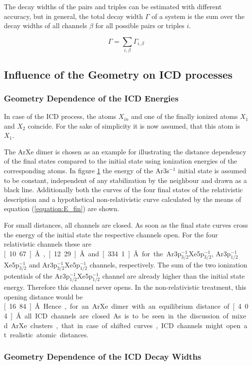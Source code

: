 The decay widths of the pairs and triples can be estimated with
different accuracy, but in general, the total decay width $\Gamma$ of
a system is the sum over the decay widths of all channels $\beta$ for
all possible pairs or triples $i$.

\begin{equation}
  \Gamma = \sum\limits_{i,\beta}\Gamma_{i,\beta}
\end{equation}


\subsection{Influence of the Geometry on ICD processes}

\subsubsection{Geometry Dependence of the ICD Energies}
In case of the \ac{ICD} process, the atoms $X_{in}$ and one of
the finally ionized atoms $X_1$ and $X_2$ coincide. For the sake of simplicity
it is now assumed, that this atom is $X_1$.

\begin{figure}[h]
 \centering
 
 \caption{}
 \label{figure:ArXe_energy_curves_unshifted}
\end{figure}

The ArXe dimer is chosen as an example for illustrating the distance
dependency of the final states compared to the initial state using
ionization energies of the corresponding atoms.
In figure \ref{figure:ArXe_energy_curves_unshifted} the energy of
the Ar3s$^{-1}$ initial
state is assumed to be constant, independent of any stabilization by the
neighbour and drawn as a black line. Additionally both the
curves of the four final states of the relativistic description and
a hypothetical non-relativistic curve calculated by the means of
equation (\ref{equation:E_fin}) are shown.

For small distances, all channels are closed. As soon as the final
state curves cross the energy of the initial state
the respective channels open. For the four relativistic channels these are
\unit[10.67]{\AA}, \unit[12.29]{\AA} and \unit[334.1]{\AA}
for the Ar3p$_{3/2}^{-1}$Xe5p$_{3/2}^{-1}$,
Ar3p$_{1/2}^{-1}$Xe5p$_{3/2}^{-1}$ and Ar3p$_{3/2}^{-1}$Xe5p$_{1/2}^{-1}$
channels, respectively.
The sum of the two ionization potentials of the
Ar3p$_{1/2}^{-1}$Xe5p$_{1/2}^{-1}$ channel are already higher than
the initial state energy. Therefore this channel never opens.
In the non-relativistic treatment, this opening distance would be
\unit[16.84]{\AA}.

Hence, for an ArXe dimer with an equilibrium distance of \unit[4.04]{\AA}
all ICD channels are closed. As is to be seen in the discussion of mixed
ArXe clusters, that in case of shifted curves, ICD channels might
open at realistic atomic distances.


\subsubsection{Geometry Dependence of the ICD Decay Widths}
